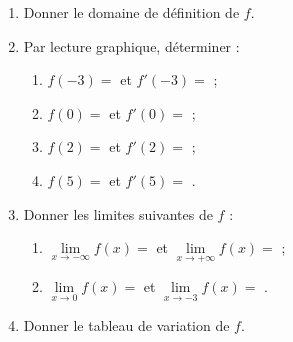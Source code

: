\documentclass[a4paper,12pt]{article}
\begin{document}
\begin{enumerate}
\item Donner le domaine de définition de $f$.
\item Par lecture graphique, déterminer :
\begin{enumerate}
\item $f(-3)=$ \underline{\hspace{3cm}} et $f'(-3)=$ \underline{\hspace{3cm}} ;
\item $f(0)=$ \underline{\hspace{3cm}} et $f'(0)=$ \underline{\hspace{3cm}} ;
\item $f(2)=$ \underline{\hspace{3cm}} et $f'(2)=$ \underline{\hspace{3cm}} ;
\item $f(5)=$ \underline{\hspace{3cm}} et $f'(5)=$ \underline{\hspace{3cm}}.
\end{enumerate}
\item Donner les limites suivantes de $f$ :
\begin{enumerate}
\item $\lim\limits_{x\to -\infty} f(x)=$ \underline{\hspace{3cm}} et $\lim\limits_{x\to +\infty} f(x)=$ \underline{\hspace{3cm}} ;
\item $\lim\limits_{x\to 0} f(x)=$ \underline{\hspace{3cm}} et $\lim\limits_{x\to -3} f(x)=$ \underline{\hspace{3cm}}.
\end{enumerate}
\item Donner le tableau de variation de $f$.
\end{enumerate}
\end{document}
